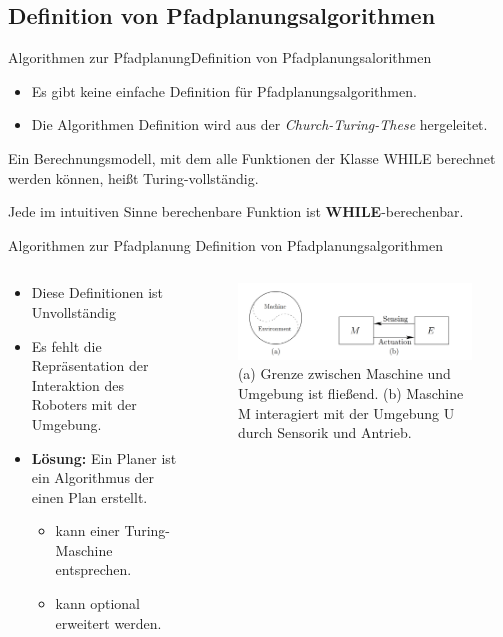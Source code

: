 \documentclass[t,aspectratio=169,dvipsnames]{beamer}
\begin{document}
\subsection{Definition von Pfadplanungsalgorithmen}
\begin{frame}{Algorithmen zur Pfadplanung}{Definition von Pfadplanungsalorithmen}
	
	\begin{itemize}
				\item Es gibt keine einfache Definition für Pfadplanungsalgorithmen.
				\item Die Algorithmen Definition wird aus der \textit{Church-Turing-These} hergeleitet.
				
	\end{itemize}
		\begin{theorem}
			Ein Berechnungsmodell, mit dem alle Funktionen
			der Klasse WHILE berechnet werden können, heißt
			Turing-vollständig.
		\end{theorem}
		\begin{theorem}
			Jede im intuitiven Sinne berechenbare Funktion ist \textbf{WHILE}-berechenbar.
		\end{theorem}
\end{frame}
	
\begin{frame}{Algorithmen zur Pfadplanung} {Definition von Pfadplanungsalgorithmen}
	\begin{columns}
		\begin{column}[T]{0.5\textwidth}
	\begin{itemize}[<+->]
		\item Diese Definitionen ist Unvollständig
		\item Es fehlt die Repräsentation der Interaktion des Roboters mit der Umgebung.
		\item \textbf{Lösung:} Ein Planer ist ein Algorithmus der einen Plan erstellt.
		\begin{itemize}
			\item kann einer Turing-Maschine entsprechen.
			\item kann optional erweitert werden.
		\end{itemize}	
	\end{itemize}
	\end{column}
		\begin{column}[T]{0.5\textwidth}
			\begin{figure}[<+->]
				\includegraphics[width=6.5cm]{images/img224.png}
				\caption{(a) Grenze zwischen Maschine und Umgebung ist fließend.\newline
						(b) Maschine M interagiert mit der Umgebung U durch Sensorik und Antrieb. } 
			\end{figure}
		\end{column}
	\end{columns}	
\end{frame}
\end{document}
